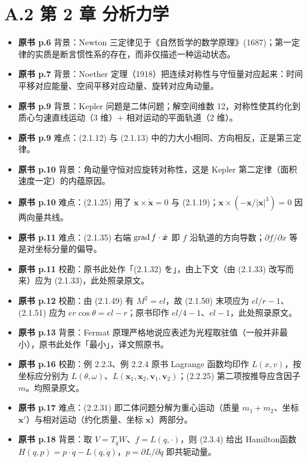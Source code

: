\section*{A.2 第 2 章 分析力学}
\begin{itemize}[leftmargin=2.4em,itemsep=4pt,label={\textbullet}]
\item \textbf{原书 p.6} 背景：Newton 三定律见于《自然哲学的数学原理》(1687)；第一定律的实质是断言惯性系的存在，而非仅描述一种运动状态。
\item \textbf{原书 p.7} 背景：Noether 定理（1918）把连续对称性与守恒量对应起来：时间平移对应能量、空间平移对应动量、旋转对应角动量。
\item \textbf{原书 p.9} 背景：Kepler 问题是二体问题；解空间维数 12，对称性使其约化到质心匀速直线运动（3 维）+ 相对运动的平面轨道（2 维）。
\item \textbf{原书 p.9} 难点：(2.1.12) 与 (2.1.13) 中的力大小相同、方向相反，正是第三定律。
\item \textbf{原书 p.10} 背景：角动量守恒对应旋转对称性，这是 Kepler 第二定律（面积速度一定）的内蕴原因。
\item \textbf{原书 p.10} 难点：(2.1.25) 用了 $\dot{\bm{x}}\times\dot{\bm{x}}=0$ 与 (2.1.19)；$\bm{x}\times(-\bm{x}/|\bm{x}|^3)=0$ 因两向量共线。
\item \textbf{原书 p.11} 难点：(2.1.35) 右端 $\operatorname{grad} f\cdot\dot{\bm{x}}$ 即 $f$ 沿轨道的方向导数；$\partial f/\partial x$ 等是对坐标分量的偏导。
\item \textbf{原书 p.11} 校勘：原书此处作「(2.1.32) を」，由上下文（由 (2.1.33) 改写而来）应为 (2.1.33)，此处照录原文。
\item \textbf{原书 p.12} 校勘：由 (2.1.49) 有 $M^2=el$，故 (2.1.50) 末项应为 $el/r-1$、(2.1.51) 应为 $er\cos\theta=el-r$；原书印作 $el/4-1$、$el-1$，此处照录原文。
\item \textbf{原书 p.13} 背景：Fermat 原理严格地说应表述为光程取驻值（一般并非最小），原书此处作「最小」，译文照原书。
\item \textbf{原书 p.16} 校勘：例 2.2.3、例 2.2.4 原书 Lagrange 函数均印作 $L(x,v)$，按坐标应分别为 $L(\theta,\omega)$、$L(\bm{x}_1,\bm{x}_2,\bm{v}_1,\bm{v}_2)$；(2.2.25) 第二项按推导应含因子 $m$。均照录原文。
\item \textbf{原书 p.17} 难点：(2.2.31) 即二体问题分解为重心运动（质量 $m_1+m_2$、坐标 $\bm{x}'$）与相对运动（约化质量、坐标 $\bm{x}$）两部分。
\item \textbf{原书 p.18} 背景：取 $V=T_qW$、$f=L(q,\cdot)$，则 (2.3.4) 给出 Hamilton函数 $H(q,p)=p\cdot\dot q-L(q,\dot q)$，$p=\partial L/\partial\dot q$ 即共轭动量。

\end{itemize}
